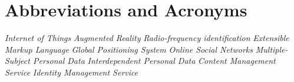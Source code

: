\documentclass[conference, 11pt]{IEEEtran}
\begin{document}
\section*{Abbreviations and Acronyms}
\begin{acronym}[Bash]
 {\textit{Internet of Things}}
 {\textit{Augmented Reality}}
 {\textit{Radio-frequency identification}}
 {\textit{Extensible Markup Language}}
 {\textit{Global Positioning System}}
 {\textit{Online Social Networks}}
 {\textit{Multiple-Subject Personal Data}}
 {\textit{Interdependent Personal Data}}
 {\textit{Content Management Service}}
 {\textit{Identity Management Service}}
\end{acronym}

\printbibliography
\end{document}
